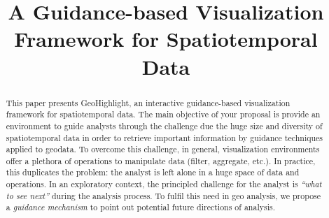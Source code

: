 \documentclass[conference]{IEEEtran}
\newcommand{\sys}{{\sc GeoHighlight}}
\begin{document}
\title{A Guidance-based Visualization Framework for Spatiotemporal Data}


\author{
\and
{}
}

\maketitle


\begin{abstract}
This paper presents \sys, an interactive guidance-based visualization framework for spatiotemporal data. The main objective of your proposal is provide an environment to guide analysts through the challenge due the huge size and diversity of spatiotemporal data in order to retrieve important information by guidance techniques applied to geodata.  To overcome this challenge, in general, visualization environments offer a plethora of operations to manipulate data (filter, aggregate, etc.). In practice, this duplicates the problem: the analyst is left alone in a huge space of data and operations. In an exploratory context, the principled challenge for the analyst is {\em ``what to see next''} during the analysis process. To fulfil this need in geo analysis, we propose a {\em guidance mechanism} to point out potential future directions of analysis. %

\end{abstract}
\end{document}
